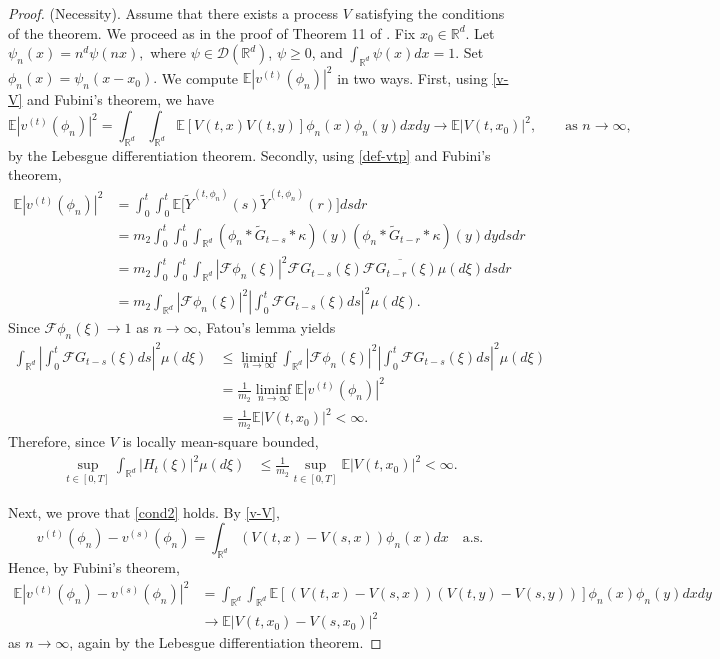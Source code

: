 \documentclass[12pt]{article}
\def\cD{\mathcal{D}}
\def\cF{\mathcal{F}}
\def\bE{\mathbb{E}}
\def\bR{\mathbb{R}}
\def\k{\kappa}
\begin{document}
\begin{proof}
(Necessity). Assume that there exists a process $V$ satisfying the conditions of the theorem. We proceed as in the proof of Theorem 11 of \cite{dalang99}. Fix $x_0\in \bR^d$. Let $\psi_n(x)=n^d\psi(nx),$ where $\psi\in \cD(\bR^d)$, $\psi\ge 0$, and $\int_{\bR^d}\psi(x)dx=1.$ Set $\phi_n(x)=\psi_n(x-x_0).$ We compute $\bE|v^{(t)}(\phi_n)|^2$ in two ways. First, using \eqref{v-V} and Fubini's theorem, we have
\[
\bE|v^{(t)}(\phi_n)|^2
=
\int_{\bR^d}\int_{\bR^d}\bE[V(t,x)V(t,y)]\phi_n(x)\phi_n(y)dxdy
\to \bE|V(t,x_0)|^2,
\qquad \mbox{as } n\to\infty,
\]
by the Lebesgue differentiation theorem. Secondly, using \eqref{def-vtp} and Fubini's theorem,
\begin{align}
\nonumber
\bE|v^{(t)}(\phi_n)|^2
&=\int_0^t\int_0^t \bE\big[\widetilde{Y}^{(t,\phi_n)}(s)\widetilde{Y}^{(t,\phi_n)}(r)\big]dsdr\\
\nonumber
&=m_2\int_0^t\int_0^t\int_{\bR^d}
(\phi_n*\widetilde{G}_{t-s}*\k)(y)(\phi_n*\widetilde{G}_{t-r}*\k)(y)dydsdr\\
\nonumber
&=m_2\int_0^t\int_0^t\int_{\bR^d}
|\cF\phi_n(\xi)|^2\cF G_{t-s}(\xi)\overline{\cF G_{t-r}(\xi)}\mu(d\xi)dsdr\\
\label{second-way}
&=m_2\int_{\bR^d}
|\cF\phi_n(\xi)|^2\left|\int_0^t \cF G_{t-s}(\xi)ds\right|^2\mu(d\xi).
\end{align}
Since $\cF\phi_n(\xi)\to 1$ as $n\to\infty$, Fatou's lemma yields
\begin{align*}
\int_{\bR^d}\left|\int_0^t \cF G_{t-s}(\xi)ds\right|^2\mu(d\xi)
&\le \liminf_{n\to\infty}
\int_{\bR^d}|\cF\phi_n(\xi)|^2\left|\int_0^t \cF G_{t-s}(\xi)ds\right|^2\mu(d\xi)\\
&=\frac{1}{m_2}\liminf_{n\to\infty}\bE|v^{(t)}(\phi_n)|^2\\
&=\frac{1}{m_2}\bE|V(t,x_0)|^2<\infty.
\end{align*}
Therefore, since $V$ is locally mean-square bounded,
\begin{align*}
\sup_{ t\in [0, T]}\int_{\bR^d}|H_t(\xi)|^2\mu(d\xi)
&\le \frac{1}{m_2}\sup_{t \in [0,T]}\bE|V(t,x_0)|^2<\infty.
\end{align*}


Next, we prove that \eqref{cond2} holds.
By \eqref{v-V},
\[
v^{(t)}(\phi_n)-v^{(s)}(\phi_n)
=
\int_{\bR^d}(V(t,x)-V(s,x))\phi_n(x)dx
\quad \mbox{a.s.}
\]
Hence, by Fubini's theorem,
\begin{align*}
\bE|v^{(t)}(\phi_n)-v^{(s)}(\phi_n)|^2
&=
\int_{\bR^d}\int_{\bR^d}
\bE[(V(t,x)-V(s,x))(V(t,y)-V(s,y))]
\phi_n(x)\phi_n(y)dxdy\\
&\to \bE|V(t,x_0)-V(s,x_0)|^2
\end{align*}
as $n\to\infty$, again by the Lebesgue differentiation theorem.


\end{proof}
\end{document}
